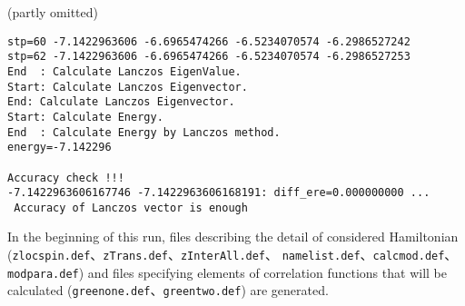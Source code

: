 (partly omitted)
\begin{verbatim}
stp=60 -7.1422963606 -6.6965474266 -6.5234070574 -6.2986527242 
stp=62 -7.1422963606 -6.6965474266 -6.5234070574 -6.2986527253 
End  : Calculate Lanczos EigenValue.
Start: Calculate Lanczos Eigenvector.
End: Calculate Lanczos Eigenvector.
Start: Calculate Energy.
End  : Calculate Energy by Lanczos method.
energy=-7.142296 

Accuracy check !!!
-7.1422963606167746 -7.1422963606168191: diff_ere=0.000000000 ...
 Accuracy of Lanczos vector is enough

\end{verbatim}

In the beginning of this run,
files describing the detail of considered Hamiltonian 
(\verb|zlocspin.def|、\verb|zTrans.def|、\verb|zInterAll.def|、
\verb|namelist.def|、\verb|calcmod.def|、\verb|modpara.def|)
and files specifying elements of correlation functions
that will be calculated
(\verb|greenone.def|、\verb|greentwo.def|)
are generated.

